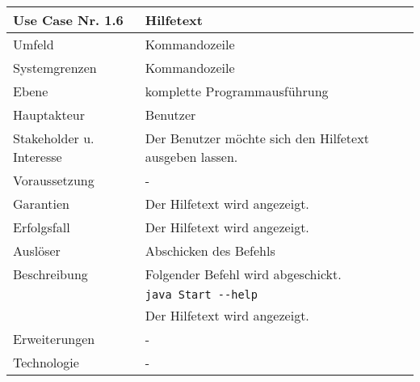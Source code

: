 \\[12pt]
\begin{tabular}{| l | l |}
 \hline
 \textbf{Use Case Nr. 1.6} & Hilfetext\\
 \hline
 Umfeld & Kommandozeile\\
 \hline
 Systemgrenzen & Kommandozeile\\
 \hline
 Ebene & komplette Programmausführung\\
 \hline
 Hauptakteur & Benutzer\\
 \hline
 Stakeholder u. Interesse & Der Benutzer möchte sich den Hilfetext ausgeben lassen.\\
 \hline
 Voraussetzung & -\\
 \hline
 Garantien & Der Hilfetext wird angezeigt.\\
 \hline
 Erfolgsfall & Der Hilfetext wird angezeigt.\\
 \hline
 Auslöser & Abschicken des Befehls\\
 \hline
 Beschreibung & Folgender Befehl wird abgeschickt.\\
	      & \verb|java Start --help|\\
	      & Der Hilfetext wird angezeigt.\\
 \hline
 Erweiterungen & -\\
 \hline
 Technologie & -\\
 \hline
\end{tabular}
